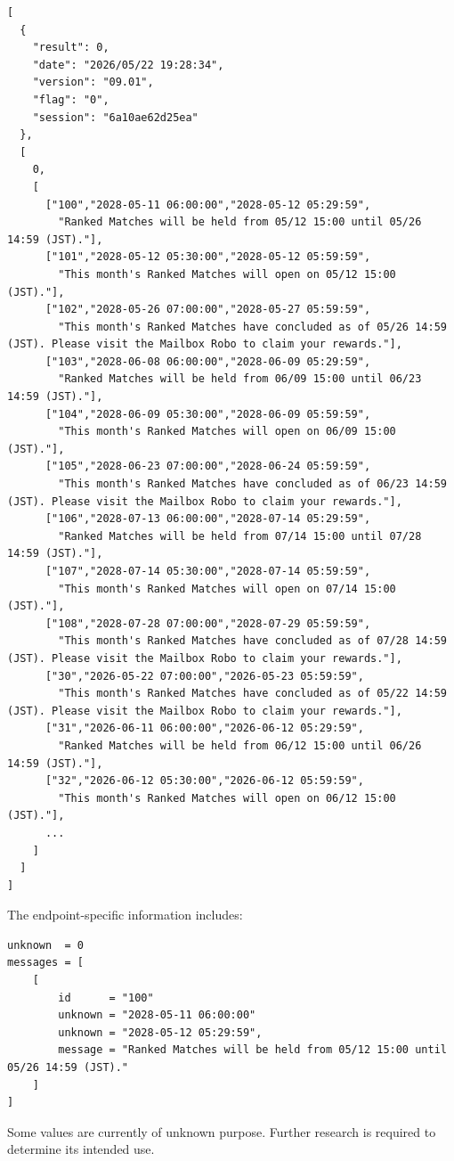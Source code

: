 \begin{lstlisting}
[
  {
    "result": 0,
    "date": "2026/05/22 19:28:34",
    "version": "09.01",
    "flag": "0",
    "session": "6a10ae62d25ea"
  },
  [
    0,
    [
      ["100","2028-05-11 06:00:00","2028-05-12 05:29:59",
        "Ranked Matches will be held from 05/12 15:00 until 05/26 14:59 (JST)."],
      ["101","2028-05-12 05:30:00","2028-05-12 05:59:59",
        "This month's Ranked Matches will open on 05/12 15:00 (JST)."],
      ["102","2028-05-26 07:00:00","2028-05-27 05:59:59",
        "This month's Ranked Matches have concluded as of 05/26 14:59 (JST). Please visit the Mailbox Robo to claim your rewards."],
      ["103","2028-06-08 06:00:00","2028-06-09 05:29:59",
        "Ranked Matches will be held from 06/09 15:00 until 06/23 14:59 (JST)."],
      ["104","2028-06-09 05:30:00","2028-06-09 05:59:59",
        "This month's Ranked Matches will open on 06/09 15:00 (JST)."],
      ["105","2028-06-23 07:00:00","2028-06-24 05:59:59",
        "This month's Ranked Matches have concluded as of 06/23 14:59 (JST). Please visit the Mailbox Robo to claim your rewards."],
      ["106","2028-07-13 06:00:00","2028-07-14 05:29:59",
        "Ranked Matches will be held from 07/14 15:00 until 07/28 14:59 (JST)."],
      ["107","2028-07-14 05:30:00","2028-07-14 05:59:59",
        "This month's Ranked Matches will open on 07/14 15:00 (JST)."],
      ["108","2028-07-28 07:00:00","2028-07-29 05:59:59",
        "This month's Ranked Matches have concluded as of 07/28 14:59 (JST). Please visit the Mailbox Robo to claim your rewards."],
      ["30","2026-05-22 07:00:00","2026-05-23 05:59:59",
        "This month's Ranked Matches have concluded as of 05/22 14:59 (JST). Please visit the Mailbox Robo to claim your rewards."],
      ["31","2026-06-11 06:00:00","2026-06-12 05:29:59",
        "Ranked Matches will be held from 06/12 15:00 until 06/26 14:59 (JST)."],
      ["32","2026-06-12 05:30:00","2026-06-12 05:59:59",
        "This month's Ranked Matches will open on 06/12 15:00 (JST)."],
	  ...
    ]
  ]
]
\end{lstlisting}

The endpoint-specific information includes:

\begin{lstlisting}
unknown  = 0
messages = [
    [
        id      = "100"
        unknown = "2028-05-11 06:00:00"
        unknown = "2028-05-12 05:29:59",
        message = "Ranked Matches will be held from 05/12 15:00 until 05/26 14:59 (JST)."
    ]
]
\end{lstlisting}

\begin{tcolorbox}[colback=yellow!10,colframe=orange!80!black,title=Warning]
Some values are currently of unknown purpose.
Further research is required to determine its intended use.
\end{tcolorbox}

\newpage